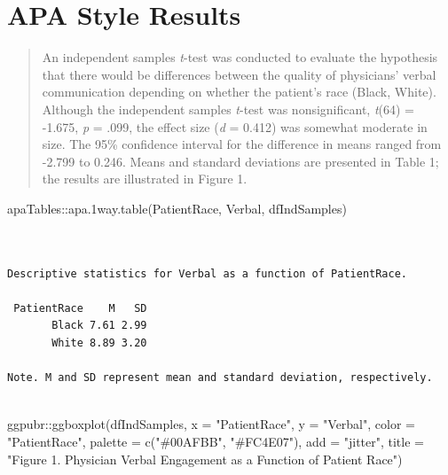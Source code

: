 \documentclass[
  11pt,
]{book}
\newenvironment{Shaded}{\begin{snugshade}}{\end{snugshade}}
\newcommand{\AttributeTok}[1]{\textcolor[rgb]{0.77,0.63,0.00}{#1}}
\newcommand{\FunctionTok}[1]{\textcolor[rgb]{0.00,0.00,0.00}{#1}}
\newcommand{\NormalTok}[1]{#1}
\newcommand{\SpecialCharTok}[1]{\textcolor[rgb]{0.00,0.00,0.00}{#1}}
\newcommand{\StringTok}[1]{\textcolor[rgb]{0.31,0.60,0.02}{#1}}
\begin{document}
\hypertarget{apa-style-results-1}{%
\section{APA Style Results}\label{apa-style-results-1}}

\begin{quote}
An independent samples \emph{t}-test was conducted to evaluate the hypothesis that there would be differences between the quality of physicians' verbal communication depending on whether the patient's race (Black, White). Although the independent samples \emph{t}-test was nonsignificant, \emph{t}(64) = -1.675, \emph{p} = .099, the effect size (\emph{d} = 0.412) was somewhat moderate in size. The 95\% confidence interval for the difference in means ranged from -2.799 to 0.246. Means and standard deviations are presented in Table 1; the results are illustrated in Figure 1.
\end{quote}

\begin{Shaded}
\begin{Highlighting}[]
\NormalTok{apaTables}\SpecialCharTok{::}\FunctionTok{apa.1way.table}\NormalTok{(PatientRace, Verbal, dfIndSamples)}
\end{Highlighting}
\end{Shaded}

\begin{verbatim}


Descriptive statistics for Verbal as a function of PatientRace.  

 PatientRace    M   SD
       Black 7.61 2.99
       White 8.89 3.20

Note. M and SD represent mean and standard deviation, respectively.
 
\end{verbatim}

\begin{Shaded}
\begin{Highlighting}[]
\NormalTok{ggpubr}\SpecialCharTok{::}\FunctionTok{ggboxplot}\NormalTok{(dfIndSamples, }\AttributeTok{x =} \StringTok{"PatientRace"}\NormalTok{, }\AttributeTok{y =} \StringTok{"Verbal"}\NormalTok{, }\AttributeTok{color =} \StringTok{"PatientRace"}\NormalTok{,}
    \AttributeTok{palette =} \FunctionTok{c}\NormalTok{(}\StringTok{"\#00AFBB"}\NormalTok{, }\StringTok{"\#FC4E07"}\NormalTok{), }\AttributeTok{add =} \StringTok{"jitter"}\NormalTok{, }\AttributeTok{title =} \StringTok{"Figure 1. Physician Verbal Engagement as a Function of Patient Race"}\NormalTok{)}
\end{Highlighting}
\end{Shaded}
\end{document}

